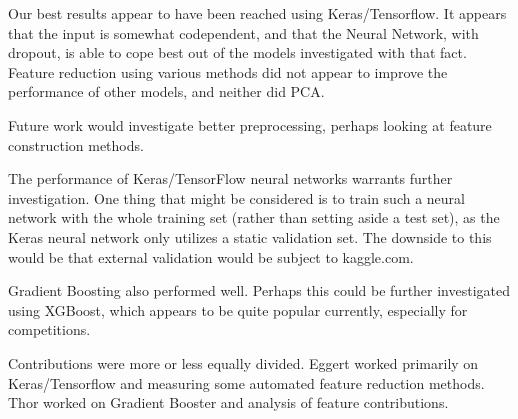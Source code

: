 \documentclass[a4paper]{article}
\begin{document}
Our best results appear to have been reached using Keras/Tensorflow.  It appears that the input is somewhat codependent, and that the Neural Network, with dropout, is able to cope best out of the models investigated with that fact.  Feature reduction using various methods did not appear to improve the performance of other models, and neither did PCA.  

Future work would investigate better preprocessing, perhaps looking at feature construction methods.

The performance of Keras/TensorFlow neural networks warrants further investigation.  One thing that might be considered is to train such a neural network with the whole training set (rather than setting aside a test set), as the Keras neural network only utilizes a static validation set.  The downside to this would be that external validation would be subject to kaggle.com.

Gradient Boosting also performed well.  Perhaps this could be further investigated using XGBoost, which appears to be quite popular currently, especially for competitions.

Contributions were more or less equally divided.  Eggert worked primarily on Keras/Tensorflow and measuring some automated feature reduction methods.  Thor worked on Gradient Booster and analysis of feature contributions.

\appendix
\setlength{\voffset}{0cm}
\setlength{\hoffset}{0cm}



\setlength{\voffset}{-2.54cm}
\setlength{\hoffset}{-2.54cm}

\end{document}
